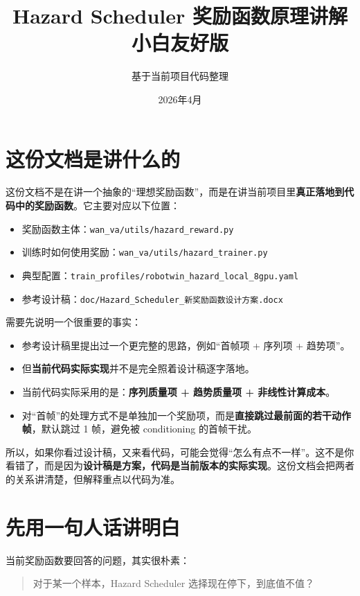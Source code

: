 \documentclass[12pt]{ctexart}
\title{Hazard Scheduler 奖励函数原理讲解\\小白友好版}
\author{基于当前项目代码整理}
\date{2026年4月}
\begin{document}
\maketitle
\tableofcontents
\newpage

\section{这份文档是讲什么的}

这份文档不是在讲一个抽象的“理想奖励函数”，而是在讲当前项目里\textbf{真正落地到代码中的奖励函数}。它主要对应以下位置：

\begin{itemize}
    \item 奖励函数主体：\texttt{wan\_va/utils/hazard\_reward.py}
    \item 训练时如何使用奖励：\texttt{wan\_va/utils/hazard\_trainer.py}
    \item 典型配置：\texttt{train\_profiles/robotwin\_hazard\_local\_8gpu.yaml}
    \item 参考设计稿：\texttt{doc/Hazard\_Scheduler\_新奖励函数设计方案.docx}
\end{itemize}

需要先说明一个很重要的事实：

\begin{itemize}
    \item 参考设计稿里提出过一个更完整的思路，例如“首帧项 + 序列项 + 趋势项”。
    \item 但\textbf{当前代码实际实现}并不是完全照着设计稿逐字落地。
    \item 当前代码实际采用的是：\textbf{序列质量项 + 趋势质量项 + 非线性计算成本}。
    \item 对“首帧”的处理方式不是单独加一个奖励项，而是\textbf{直接跳过最前面的若干动作帧}，默认跳过 1 帧，避免被 conditioning 的首帧干扰。
\end{itemize}

所以，如果你看过设计稿，又来看代码，可能会觉得“怎么有点不一样”。这不是你看错了，而是因为\textbf{设计稿是方案，代码是当前版本的实际实现}。这份文档会把两者的关系讲清楚，但解释重点以代码为准。

\section{先用一句人话讲明白}

当前奖励函数要回答的问题，其实很朴素：

\begin{quote}
    对于某一个样本，Hazard Scheduler 选择现在停下，到底值不值？
\end{quote}
\end{document}
